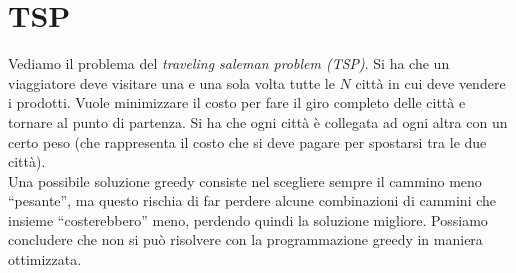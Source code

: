 \documentclass[a4paper,12pt, oneside]{book}
\begin{document}
\section{TSP}
Vediamo il problema del \textit{traveling saleman problem (TSP)}. Si
ha che un viaggiatore deve visitare una e una sola volta tutte le $N$
città in cui deve vendere i prodotti. Vuole minimizzare il costo per
fare il giro completo delle città e tornare al punto di partenza. Si
ha che ogni città è collegata ad ogni altra con un certo peso (che
rappresenta il costo che si deve pagare per spostarsi tra le due
città).\\
Una possibile soluzione greedy consiste nel scegliere sempre il
cammino meno ``pesante'', ma questo rischia di far perdere alcune
combinazioni di cammini che insieme ``costerebbero'' meno, perdendo
quindi la soluzione migliore. Possiamo concludere che non si può
risolvere con la programmazione greedy in maniera ottimizzata.
\end{document}
